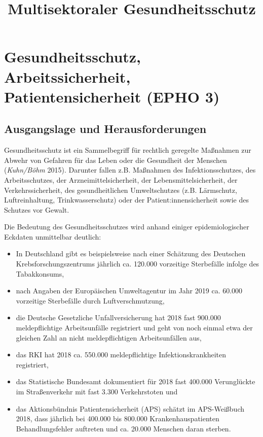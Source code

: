 \documentclass{article}
\begin{document}
\title{Multisektoraler Gesundheitsschutz}

\maketitle


\section{Gesundheitsschutz, Arbeitssicherheit, Patientensicherheit (EPHO 3)}\label{H9997734}



\subsection{Ausgangslage und Herausforderungen}\label{H5940785}



Gesundheitsschutz ist ein Sammelbegriff für rechtlich geregelte Maßnahmen zur Abwehr von Gefahren für das Leben oder die Gesundheit der Menschen (\emph{Kuhn/Böhm} 2015). Darunter fallen z.B. Maßnahmen des Infektionsschutzes, des Arbeitsschutzes, der Arzneimittelsicherheit, der Lebensmittelsicherheit, der Verkehrssicherheit, des gesundheitlichen Umweltschutzes (z.B. Lärmschutz, Luftreinhaltung, Trinkwasserschutz) oder der Patient:innensicherheit sowie des Schutzes vor Gewalt. 


Die Bedeutung des Gesundheitsschutzes wird anhand einiger epidemiologischer Eckdaten unmittelbar deutlich: 

\begin{itemize}
\item In Deutschland gibt es beispielsweise nach einer Schätzung des Deutschen Krebsforschungszentrums jährlich ca. 120.000 vorzeitige Sterbefälle infolge des Tabakkonsums, 


\item nach Angaben der Europäischen Umweltagentur im Jahr 2019 ca. 60.000 vorzeitige Sterbefälle durch Luftverschmutzung,


\item die Deutsche Gesetzliche Unfallversicherung hat 2018 fast 900.000 meldepflichtige Arbeitsunfälle registriert und geht von noch einmal etwa der gleichen Zahl an nicht meldepflichtigen Arbeitsunfällen aus,


\item das RKI hat 2018 ca. 550.000 meldepflichtige Infektionskrankheiten registriert, 


\item das Statistische Bundesamt dokumentiert für 2018 fast 400.000 Verunglückte im Straßenverkehr mit fast 3.300 Verkehrstoten und


\item das Aktionsbündnis Patientensicherheit (APS) schätzt im APS-Weißbuch 2018, dass jährlich bei 400.000 bis 800.000 Krankenhauspatienten Behandlungsfehler auftreten und ca. 20.000 Menschen daran sterben. 


\end{itemize}
\end{document}
